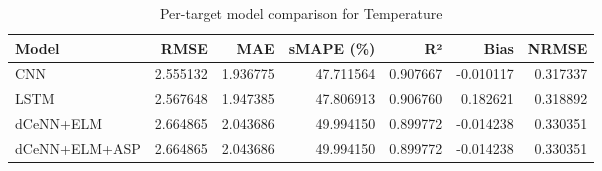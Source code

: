 \begin{table}
\caption{Per-target model comparison for Temperature}
\begin{tabular}{lrrrrrr}
\toprule
Model & RMSE & MAE & sMAPE (\%) & R² & Bias & NRMSE \\
\midrule
CNN & 2.555132 & 1.936775 & 47.711564 & 0.907667 & -0.010117 & 0.317337 \\
LSTM & 2.567648 & 1.947385 & 47.806913 & 0.906760 & 0.182621 & 0.318892 \\
dCeNN+ELM & 2.664865 & 2.043686 & 49.994150 & 0.899772 & -0.014238 & 0.330351 \\
dCeNN+ELM+ASP & 2.664865 & 2.043686 & 49.994150 & 0.899772 & -0.014238 & 0.330351 \\
\bottomrule
\end{tabular}
\end{table}
